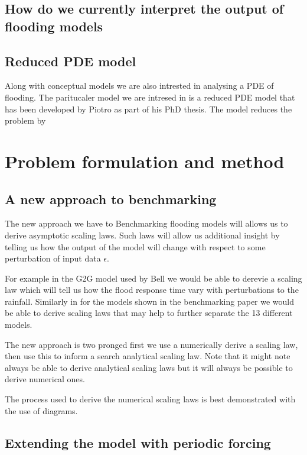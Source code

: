 \documentclass[11pt]{article}
\begin{document}
\subsection{How do we currently interpret the output of flooding models}

\subsection{Reduced PDE model}

Along with conceptual models we are also intrested in analysing a PDE of flooding. The paritucaler model we are intresed in is a reduced PDE model that has been developed by Piotro as part of his PhD thesis. The model reduces the problem by 


\section{Problem formulation and method}

\subsection{A new approach to benchmarking}
The new approach we have to Benchmarking flooding models will allows us to derive asymptotic scaling laws. 
Such laws will allow us additional insight by telling us how the output of the model will change with respect to some perturbation of input data $\epsilon$.

For example in the G2G model used by Bell we would be able to derevie a scaling law which will tell us how the flood response time vary with perturbations to the rainfall. Similarly in for the models shown in the benchmarking paper we would be able to derive scaling laws that may help to further separate the 13 different models.

The new approach is two pronged first we use a numerically derive a scaling law, then use this to inform a search analytical scaling law. Note that it might note always be able to derive analytical scaling laws but it will always be possible to derive numerical ones.

The process used to derive the numerical scaling laws is best demonstrated with the use of diagrams.


\subsection{Extending the model with periodic forcing}
\end{document}
